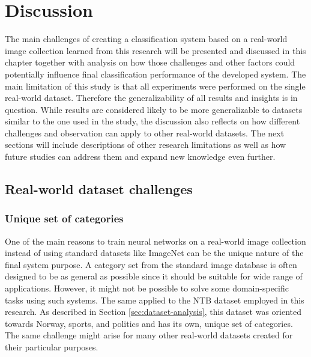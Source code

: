 \chapter{Discussion}
\label{chap:discussion}
The main challenges of creating a classification system based on a real-world image collection learned from this research will be presented and discussed in this chapter together with analysis on how those challenges and other factors could potentially influence final classification performance of the developed system. The main limitation of this study is that all experiments were performed on the single real-world dataset. Therefore the generalizability of all results and insights is in question. While results are considered likely to be more generalizable to datasets similar to the one used in the study, the discussion also reflects on how different challenges and observation can apply to other real-world datasets. The next sections will include descriptions of other research limitations as well as how future studies can address them and expand new knowledge even further.

\section{Real-world dataset challenges}
\label{sec:real-world-dataset-challenges}

\subsection{Unique set of categories}
One of the main reasons to train neural networks on a real-world image collection instead of using standard datasets like ImageNet can be the unique nature of the final system purpose. A category set from the standard image database is often designed to be as general as possible since it should be suitable for wide range of applications. However, it might not be possible to solve some domain-specific tasks using such systems. The same applied to the NTB dataset employed in this research. As described in Section \ref{sec:dataset-analysis}, this dataset was oriented towards Norway, sports, and politics and has its own, unique set of categories. The same challenge might arise for many other real-world datasets created for their particular purposes.

